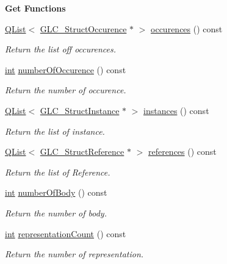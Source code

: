 \begin{Indent}{\bf Get Functions}
\begin{DoxyCompactItemize}
\hyperlink{class_q_list}{Q\-List}$<$ \hyperlink{class_g_l_c___struct_occurence}{G\-L\-C\-\_\-\-Struct\-Occurence} $\ast$ $>$ \hyperlink{class_g_l_c___world_handle_a049b8791733897228fa8c702a6cde75a}{occurences} () const 
\begin{DoxyCompactList}\small\item\em Return the list off occurences. \end{DoxyCompactList}\item 
\hyperlink{ioapi_8h_a787fa3cf048117ba7123753c1e74fcd6}{int} \hyperlink{class_g_l_c___world_handle_a8099e1f606dbe5aeec476c7aed3bc07c}{number\-Of\-Occurence} () const 
\begin{DoxyCompactList}\small\item\em Return the number of occurence. \end{DoxyCompactList}\item 
\hyperlink{class_q_list}{Q\-List}$<$ \hyperlink{class_g_l_c___struct_instance}{G\-L\-C\-\_\-\-Struct\-Instance} $\ast$ $>$ \hyperlink{class_g_l_c___world_handle_abf85630cd1b3bc0f823c1531f60c4867}{instances} () const 
\begin{DoxyCompactList}\small\item\em Return the list of instance. \end{DoxyCompactList}\item 
\hyperlink{class_q_list}{Q\-List}$<$ \hyperlink{class_g_l_c___struct_reference}{G\-L\-C\-\_\-\-Struct\-Reference} $\ast$ $>$ \hyperlink{class_g_l_c___world_handle_ad8c8065a808d6620b57ea46dcec1dfb6}{references} () const 
\begin{DoxyCompactList}\small\item\em Return the list of Reference. \end{DoxyCompactList}\item 
\hyperlink{ioapi_8h_a787fa3cf048117ba7123753c1e74fcd6}{int} \hyperlink{class_g_l_c___world_handle_ab36eddeb6d71dce68100266f37598b87}{number\-Of\-Body} () const 
\begin{DoxyCompactList}\small\item\em Return the number of body. \end{DoxyCompactList}\item 
\hyperlink{ioapi_8h_a787fa3cf048117ba7123753c1e74fcd6}{int} \hyperlink{class_g_l_c___world_handle_aadfc2a2f22b21700ac1b13d343570f4d}{representation\-Count} () const 
\begin{DoxyCompactList}\small\item\em Return the number of representation. \end{DoxyCompactList}\item 

\end{DoxyCompactItemize}
\end{Indent}
